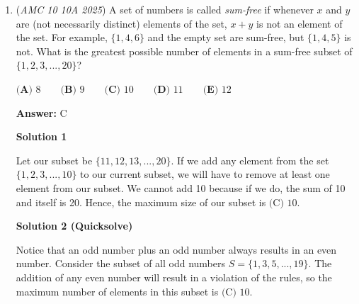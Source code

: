 \begin{enumerate}
 Since $BCDG$ is a rectangle, $BC = GD = 40$.

 Using the Pythagorean Theorem on triangle $AGD$ gives $(15-g)^2 + 40^2 = (5\sqrt{21} + \sqrt{g^2 + 300})^2$Expanding the squares, rearranging, and simplifying gives the quadratic $3g^2 + 150g - 925 = 0$.Completing the square and taking only the positive square root seems like the easiest method to find $g$ here
 \[3(g^2 + 50g) = 925\]
 \[3(g^2 + 50g + 625) = 925 + 3(625)\]
 \[(g+25) = \sqrt{\frac{2800}{3}} = \frac{20\sqrt{21}}{3}\]
 \[g = \frac{20\sqrt{21} - 75}{3}\]

 Finally, $a + b + c + d = 20 + 21 + 75 + 3 = \boxed{\textbf{(A) 119}}$




\textbf{Solution 8}

<asy>import geometry;unitsize(7);pair \_O = (0,0);pair \_B = (-20,0);pair \_A = (-20,-15);pair \_C = (10,0);pair \_D = (20,0);pair \_E = (20, -(20sqrt(21)-75)/3);pair \_F = (10, -(5sqrt(21)-30);

 


 


	\item (\textit{AMC 10 10A 2025}) A set of numbers is called \textit{sum-free} if whenever $x$ and $y$ are (not necessarily distinct) elements of the set, $x+y$ is not an element of the set. For example, $\{1,4,6\}$ and the empty set are sum-free, but $\{1,4,5\}$ is not. What is the greatest possible number of elements in a sum-free subset of $\{1,2,3,...,20\}$?


 $\textbf{(A) } 8 \qquad\textbf{(B) } 9 \qquad\textbf{(C) } 10 \qquad\textbf{(D) } 11 \qquad\textbf{(E) } 12$

 \textbf{Answer: }C



\textbf{Solution 1}

Let our subset be $\{11,12,13,...,20\}.$ If we add any element from the set $\{1,2,3,...,10\}$ to our current subset, we will have to remove at least one element from our subset. We cannot add 10 because if we do, the sum of 10 and itself is 20. Hence, the maximum size of our subset is $\boxed{\text{(C) }10}$.

 



\textbf{Solution 2 (Quicksolve)}

Notice that an odd number plus an odd number always results in an even number. Consider the subset of all odd numbers $S = \{1, 3, 5, ..., 19\}$. The addition of any even number will result in a violation of the rules, so the maximum number of elements in this subset is $\boxed{\text{(C) }10}$.


\end{enumerate}
